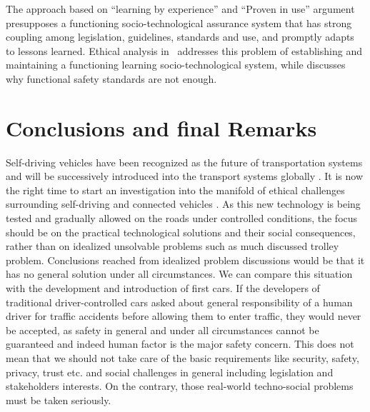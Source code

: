 The approach based on \enquote{learning by experience} and \enquote{Proven in use} argument \cite{GovernmentNL2017,NationalInstruments2014a,DBLP:journals/corr/SchabeB15} presupposes a functioning socio-technological assurance system that has strong coupling among legislation, guidelines, standards and use, and promptly adapts to lessons learned. Ethical analysis in~\cite{DodigCrnkovic2012, Thekkilakattil_7273594,Johnsen2017_7958474} addresses this problem of establishing and maintaining a functioning learning socio-technological system, while \cite{Johnsen2017_7958474} discusses why functional safety standards are not enough.





					



\section{Conclusions and final Remarks}
\label{sec:Conclusions}
Self-driving vehicles have been recognized as the future of transportation systems and will be successively introduced into the transport systems globally \cite{EthicsCommission2017pr,Pillath2016,NHTSA2016PolicyUpdate}. It is now the right time to start an investigation into the manifold of ethical challenges surrounding self-driving and connected vehicles \cite{EthicsCommission2017b}. As this new technology is being tested and gradually allowed on the roads under controlled conditions, the focus should be on the practical technological solutions and their social consequences, rather than on idealized unsolvable problems such as much discussed trolley problem. Conclusions reached from idealized problem discussions would be that it has no general solution under all circumstances. We can compare this situation with the development and introduction of first cars. If the developers of traditional driver-controlled cars asked about general responsibility of a human driver for traffic accidents before allowing them to enter traffic, they would never be accepted, as safety in general and under all circumstances cannot be guaranteed and indeed human factor is the major safety concern. This does not mean that we should not take care of the basic requirements like security, safety, privacy, trust etc. and social challenges in general including legislation and stakeholders interests. On the contrary, those real-world techno-social problems must be taken seriously.


